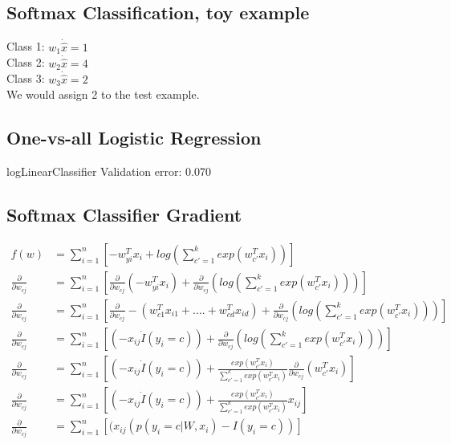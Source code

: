 \documentclass{article}
\begin{document}
\subsection{Softmax Classification, toy example}
Class 1: $w_1\dot\hat{x} = 1$\\
Class 2: $w_2\dot\hat{x} = 4$\\
Class 3: $w_3\dot\hat{x} = 2$\\

We would assign 2 to the test example.

\subsection{One-vs-all Logistic Regression}
logLinearClassifier Validation error: 0.070

\subsection{Softmax Classifier Gradient}
\begin{equation*}
    \begin{split}
        f(w) &= \sum_{i=1}^n[-w_{yi}^Tx_i + log(\sum_{c' = 1}^kexp(w_{c'}^Tx_i))]\\
        \frac{\partial}{\partial w_{cj}} &= \sum_{i=1}^n[\frac{\partial}{\partial w_{cj}}(-w_{yi}^Tx_i) + \frac{\partial}{\partial w_{cj}}(log(\sum_{c' = 1}^kexp(w_{c'}^Tx_i)))]\\
        \frac{\partial}{\partial w_{cj}} &= \sum_{i=1}^n[\frac{\partial}{\partial w_{cj}}-(w_{c1}^Tx_{i1}+....+w_{cd}^Tx_{id}) + \frac{\partial}{\partial w_{cj}}(log(\sum_{c' = 1}^kexp(w_{c'}^Tx_i)))]\\
        \frac{\partial}{\partial w_{cj}} &= \sum_{i=1}^n[(-x_{ij}\dot I(y_i = c)) + \frac{\partial}{\partial w_{cj}}(log(\sum_{c' = 1}^kexp(w_{c'}^Tx_i)))]\\
        \frac{\partial}{\partial w_{cj}} &= \sum_{i=1}^n[(-x_{ij}\dot I(y_i = c)) + \frac{exp(w_{c'}^Tx_i)}{\sum_{c' = 1}^kexp(w_{c'}^Tx_i)}\frac{\partial}{\partial w_{cj}}(w_{c'}^Tx_i)]\\
        \frac{\partial}{\partial w_{cj}} &= \sum_{i=1}^n[(-x_{ij}\dot I(y_i = c)) + \frac{exp(w_{c'}^Tx_i)}{\sum_{c' = 1}^kexp(w_{c'}^Tx_i)}x_{ij}]\\
        \frac{\partial}{\partial w_{cj}} &= \sum_{i=1}^n[(x_{ij}(p(y_i = c | W, x_i) - I(y_i = c))]\\
    \end{split}
\end{equation*}
\end{document}
